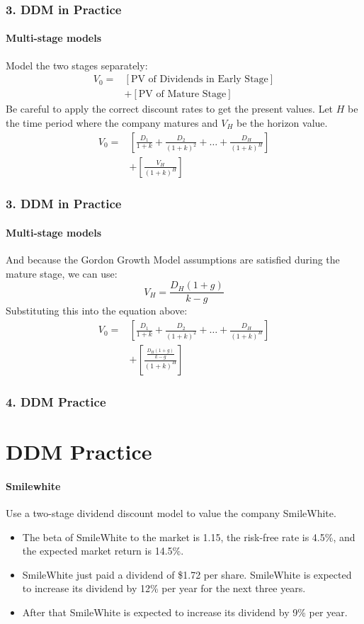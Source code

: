 \documentclass{beamer}
\begin{document}
\begin{frame}[t]
    \frametitle{3. DDM in Practice}
    \framesubtitle{Multi-stage models}
    
    Model the two stages separately:
    \begin{align*}
    V_0 = &[\text{PV of Dividends in Early Stage}] \\
    &+ [\text{PV of Mature Stage}]
    \end{align*}
    Be careful to apply the correct discount rates to get the present values.   Let $H$ be the time period where the company matures and $V_H$ be the horizon value.
    \begin{align*}
    V_0 = &\left[\frac{D_1}{1+k} + \frac{D_2}{(1+k)^2} + \ldots + \frac{D_H}{(1+k)^H}\right]\\
    &+ \left[\frac{V_H}{(1+k)^H}\right]
    \end{align*}

\end{frame}

\begin{frame}[t]
    \frametitle{3. DDM in Practice}
    \framesubtitle{Multi-stage models}

    
    And because the Gordon Growth Model assumptions are satisfied during the mature stage, we can use:
    $$
    V_H = \frac{D_H(1+g)}{k-g}
    $$
    Substituting this into the equation above:
    \begin{align*}
    V_0 = &\left[\frac{D_1}{1+k} + \frac{D_2}{(1+k)^2} + \ldots + \frac{D_H}{(1+k)^H}\right] \\
    &+ [\frac{\frac{D_H(1+g)}{k-g}}{(1+k)^H}]
    \end{align*}

\end{frame}

\begin{practiceframe}[t]
    \frametitle{4. DDM Practice}
    \section{DDM Practice}
    \framesubtitle{Smilewhite}

    Use a two-stage dividend discount model to value the company SmileWhite.   
    \begin{itemize}
        \item The beta of SmileWhite to the market is 1.15, the risk-free rate is 4.5\%,
     and the expected market return is 14.5\%. 
        \item SmileWhite just paid a dividend of \$1.72 per share.  SmileWhite is expected to increase its dividend by 12\% per year for the next three years.  
        \item After that SmileWhite is expected to increase its dividend by 9\% per year.\\
    \end{itemize}

\end{practiceframe}
\end{document}

